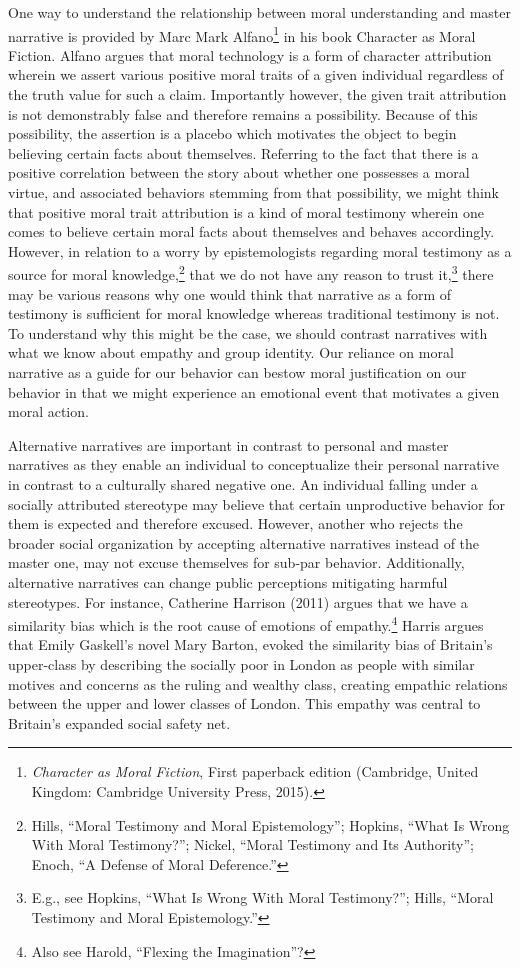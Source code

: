 \documentclass[phdthesis,12pt,final,a4paper]{wuthesis}
\theoremstyle{definition}
\theoremstyle{definition}
\theoremstyle{definition}
\theoremstyle{definition}
\theoremstyle{remark}
\begin{document}
One way to understand the relationship between moral understanding and master narrative is provided by Marc Mark Alfano\footnote{\emph{Character as Moral Fiction}, First paperback edition (Cambridge, United Kingdom: Cambridge University Press, 2015).} in his book Character as Moral Fiction. Alfano argues that moral technology is a form of character attribution wherein we assert various positive moral traits of a given individual regardless of the truth value for such a claim. Importantly however, the given trait attribution is not demonstrably false and therefore remains a possibility. Because of this possibility, the assertion is a placebo which motivates the object to begin believing certain facts about themselves. Referring to the fact that there is a positive correlation between the story about whether one possesses a moral virtue, and associated behaviors stemming from that possibility, we might think that positive moral trait attribution is a kind of moral testimony wherein one comes to believe certain moral facts about themselves and behaves accordingly. However, in relation to a worry by epistemologists regarding moral testimony as a source for moral knowledge,\footnote{Hills, {``Moral Testimony and Moral Epistemology''}; Hopkins, {``What {Is Wrong With Moral Testimony}?''}; Nickel, {``Moral {Testimony} and Its {Authority}''}; Enoch, {``A {Defense} of {Moral Deference}.''}} that we do not have any reason to trust it,\footnote{E.g., see Hopkins, {``What {Is Wrong With Moral Testimony}?''}; Hills, {``Moral Testimony and Moral Epistemology.''}} there may be various reasons why one would think that narrative as a form of testimony is sufficient for moral knowledge whereas traditional testimony is not. To understand why this might be the case, we should contrast narratives with what we know about empathy and group identity. Our reliance on moral narrative as a guide for our behavior can bestow moral justification on our behavior in that we might experience an emotional event that motivates a given moral action.

Alternative narratives are important in contrast to personal and master narratives as they enable an individual to conceptualize their personal narrative in contrast to a culturally shared negative one. An individual falling under a socially attributed stereotype may believe that certain unproductive behavior for them is expected and therefore excused. However, another who rejects the broader social organization by accepting alternative narratives instead of the master one, may not excuse themselves for sub-par behavior. Additionally, alternative narratives can change public perceptions mitigating harmful stereotypes. For instance, Catherine Harrison (2011) argues that we have a similarity bias which is the root cause of emotions of empathy.\footnote{Also see Harold, {``Flexing the {Imagination}''}?} Harris argues that Emily Gaskell's novel Mary Barton, evoked the similarity bias of Britain's upper-class by describing the socially poor in London as people with similar motives and concerns as the ruling and wealthy class, creating empathic relations between the upper and lower classes of London. This empathy was central to Britain's expanded social safety net.
\end{document}
